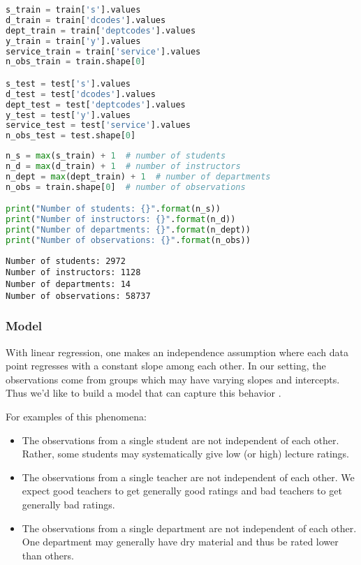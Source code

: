\begin{lstlisting}[language=Python]
s_train = train['s'].values
d_train = train['dcodes'].values
dept_train = train['deptcodes'].values
y_train = train['y'].values
service_train = train['service'].values
n_obs_train = train.shape[0]

s_test = test['s'].values
d_test = test['dcodes'].values
dept_test = test['deptcodes'].values
y_test = test['y'].values
service_test = test['service'].values
n_obs_test = test.shape[0]
\end{lstlisting}

\begin{lstlisting}[language=Python]
n_s = max(s_train) + 1  # number of students
n_d = max(d_train) + 1  # number of instructors
n_dept = max(dept_train) + 1  # number of departments
n_obs = train.shape[0]  # number of observations

print("Number of students: {}".format(n_s))
print("Number of instructors: {}".format(n_d))
print("Number of departments: {}".format(n_dept))
print("Number of observations: {}".format(n_obs))
\end{lstlisting}

\begin{lstlisting}
Number of students: 2972
Number of instructors: 1128
Number of departments: 14
Number of observations: 58737
\end{lstlisting}

\subsubsection{Model}

With linear regression, one makes an independence assumption where
each data point regresses with a constant slope among each other. In
our setting, the observations come from groups which may have
varying slopes and intercepts. Thus we'd like to build a model that
can capture this behavior \citep{gelman2006data}.

For examples of this phenomena:
\begin{itemize}
\item The observations from a single student are not independent of
each other. Rather, some students may systematically give low (or
high) lecture ratings.
\item The observations from a single teacher are not independent of
each other. We expect good teachers to get generally good ratings and
bad teachers to get generally bad ratings.
\item The observations from a single department are not independent of
each other. One department may generally have dry material and thus be
rated lower than others.
\end{itemize}

